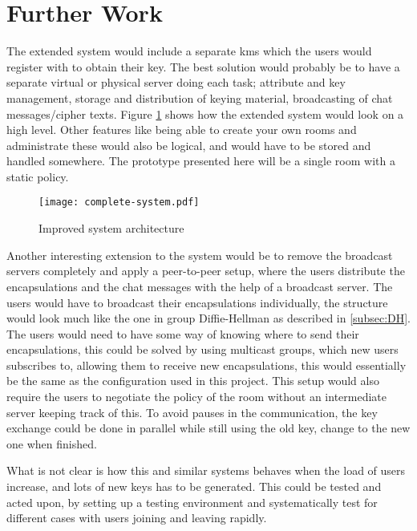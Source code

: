 \section{Further Work}
The extended system would include a separate \gls{kms} which the users would register with to obtain their key. The best solution would probably be to have a separate virtual or physical server doing each task; attribute and key management, storage and distribution of keying material, broadcasting of chat messages/cipher texts. Figure \ref{fig:improved} shows how the extended system would look on a high level. Other features like being able to create your own rooms and administrate these would also be logical, and would have to be stored and handled somewhere. The prototype presented here will be a single room with a static policy.

\begin{figure}
\centering
\texttt{[image: complete-system.pdf]}
\caption{Improved system architecture}
\label{fig:improved}
\end{figure}

\par Another interesting extension to the system would be to remove the broadcast servers completely and apply a peer-to-peer setup, where the users distribute the encapsulations and the chat messages with the help of a broadcast server. The users would have to broadcast their encapsulations individually, the structure would look much like the one in group Diffie-Hellman as described in \ref{subsec:DH}. The users would need to have some way of knowing where to send their encapsulations, this could be solved by using multicast groups, which new users subscribes to, allowing them to receive new encapsulations, this would essentially be the same as the configuration used in this project. This setup would also require the users to negotiate the policy of the room without an intermediate server keeping track of this. To avoid pauses in the communication, the key exchange could be done in parallel while still using the old key, change to the new one when finished. 

\par What is not clear is how this and similar systems behaves when the load of users increase, and lots of new keys has to be generated. This could be tested and acted upon, by setting up a testing environment and systematically test for different cases with users joining and leaving rapidly.

